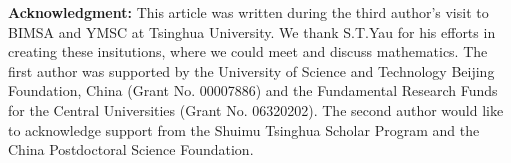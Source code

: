 \documentclass[11pt,leqno]{article}
\theoremstyle{remark}
\newtheorem{rem}{Remark}
\theoremstyle{definition}
\begin{document}

{\bf Acknowledgment:} This article was written during the third author's visit to BIMSA and YMSC at Tsinghua University. We thank S.T.Yau for his efforts in creating these insitutions, where we could meet and discuss mathematics. The first author was supported by the University of Science and Technology Beijing Foundation, China (Grant No. 00007886) and the Fundamental Research Funds for the Central Universities (Grant No. 06320202). The second author would like to acknowledge support from the Shuimu Tsinghua Scholar Program and the China Postdoctoral Science Foundation.
\end{document}
